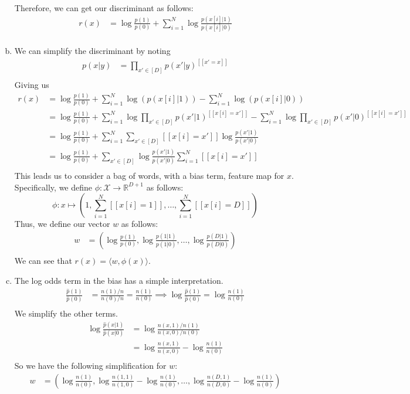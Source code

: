 \documentclass{amsart}
\newcommand{\rr}{\mathbb{R}}    %
\theoremstyle{definition}
\begin{document}
\begin{enumerate}[(a)]
		Therefore, we can get our discriminant as follows:
		\begin{align*}
			r(x) &= \log\frac{p(1)}{p(0)} + \sum_{i=1}^{N}\log\frac{p(x[i]|1)}{p(x[i]|0)}\\
		\end{align*}	
	\item 
		We can simplify the discriminant by noting
		\begin{align*}
			p(x|y) &= \prod_{x' \in [D]} p(x'|y)^{[[x' = x]]}\\
		\end{align*}
		Giving us
		\begin{align*}
			r(x) &= \log\frac{p(1)}{p(0)} + \sum_{i=1}^{N} \log(p(x[i]|1)) - \sum_{i=1}^{N} \log(p(x[i]|0))\\
			&= \log\frac{p(1)}{p(0)} + \sum_{i=1}^{N} \log\prod_{x'\in [D]} p(x'|1)^{[[x[i] = x']]} - \sum_{i=1}^{N} \log\prod_{x'\in [D]} p(x'|0)^{[[x[i] = x']]}\\
			&= \log\frac{p(1)}{p(0)} + \sum_{i=1}^{N} \sum_{x'\in [D]} [[x[i] = x']]\log \frac{p(x'|1)}{p(x'|0)}\\
			&= \log\frac{p(1)}{p(0)} + \sum_{x' \in [D]} \log \frac{p(x'|1)}{p(x'|0)}\sum_{i=1}^{N} [[x[i] = x']]\\
		\end{align*}
		This leads us to consider a bag of words, with a bias term, feature map for $x$. Specifically, we define $\phi: \mathcal{X} \to \rr^{D+1}$ as follows:
		\[\phi : x \mapsto \left(1, \sum_{i=1}^{N} [[x[i] = 1]], \ldots, \sum_{i = 1}^{N} [[x[i] = D]]\right)\]
		Thus, we define our vector $w$ as follows:
		\begin{align*}
			w &= \left(\log\frac{p(1)}{p(0)}, \log \frac{p(1|1)}{p(1|0)}, \ldots, \log \frac{p(D|1)}{p(D|0)}\right)\\
		\end{align*}
		We can see that $r(x) = \langle w, \phi(x)\rangle$.
	\item 
		The log odds term in the bias has a simple interpretation. 
		\begin{align*}
			\frac{\hat{p}(1)}{\hat{p}(0)} &= \frac{n(1)/n}{n(0)/n} = \frac{n(1)}{n(0)} \implies \log\frac{\hat{p}(1)}{\hat{p}(0)} = \log\frac{n(1)}{n(0)}\\
		\end{align*}
		We simplify the other terms.
		\begin{align*}
			\log\frac{\hat{p}(x|1)}{\hat{p}(x|0)} &= \log\frac{n(x, 1)/n(1)}{n(x, 0)/n(0)}\\
			&= \log\frac{n(x,1)}{n(x,0)} - \log\frac{n(1)}{n(0)}\\
		\end{align*}
		So we have the following simplification for $w$:
		\begin{align*}
			w &= \left(\log\frac{n(1)}{n(0)}, \log\frac{n(1, 1)}{n(1, 0)} - \log\frac{n(1)}{n(0)}, \ldots, \log\frac{n(D, 1)}{n(D, 0)} - \log\frac{n(1)}{n(0)}\right)\\
		\end{align*}
\end{enumerate}
\end{document}
